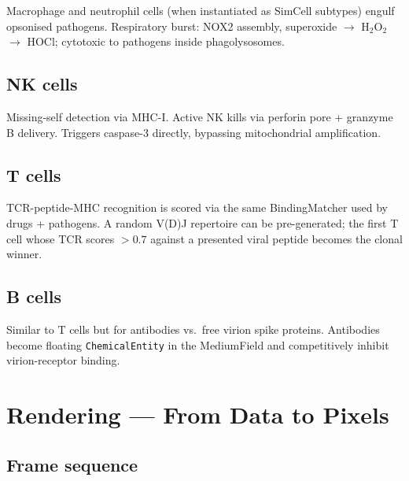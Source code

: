 \documentclass[11pt,letterpaper,twoside,openany]{book}
\newcommand{\code}[1]{\texttt{#1}}
\begin{document}
Macrophage and neutrophil cells (when instantiated as SimCell
subtypes) engulf opsonised pathogens. Respiratory burst: NOX2
assembly, superoxide $\to$ H$_2$O$_2$ $\to$ HOCl; cytotoxic to
pathogens inside phagolysosomes.

\section{NK cells}

Missing-self detection via MHC-I. Active NK kills via perforin
pore + granzyme B delivery. Triggers caspase-3 directly,
bypassing mitochondrial amplification.

\section{T cells}

TCR-peptide-MHC recognition is scored via the same BindingMatcher
used by drugs + pathogens. A random V(D)J repertoire can be
pre-generated; the first T cell whose TCR scores $> 0.7$ against a
presented viral peptide becomes the clonal winner.

\section{B cells}

Similar to T cells but for antibodies vs.\ free virion spike
proteins. Antibodies become floating \code{ChemicalEntity} in the
MediumField and competitively inhibit virion-receptor binding.

\chapter{Rendering --- From Data to Pixels}
\label{ch:rendering-deep}

\section{Frame sequence}
\end{document}
